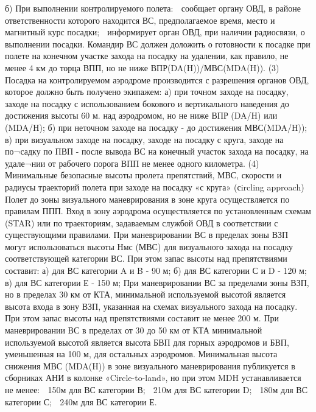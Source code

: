 б)	При выполнении контролируемого полета:
	сообщает органу ОВД, в районе ответственности которого находится ВС, предполагаемое время, место и магнитный курс посадки;
	информирует орган ОВД, при наличии радиосвязи, о выполнении посадки. 
Командир ВС должен доложить о готовности к посадке при полете на конечном участке захода на посадку на удалении, как правило, не менее 4 км до торца ВПП, но не ниже ВПР(DA(H))/МВС(MDA(H)).
(3) Посадка на контролируемом аэродроме производится с разрешения органов ОВД, которое должно быть получено экипажем:
а)	при точном заходе на посадку, заходе на посадку с использованием бокового и вертикального наведения до достижения высоты 60 м. над аэродромом, но не ниже ВПР (DA/H) или (MDA/H);
б)	при неточном заходе на посадку - до достижения МВС(MDA/H));
в)	при визуальном заходе на посадку, заходе на посадку с круга, заходе на по¬садку по ПВП - после вывода ВС на конечный участок захода на посадку, на удале¬нии от рабочего порога ВПП не менее одного километра.
(4) Минимальные безопасные высоты пролета препятствий, МВС, скорости и радиусы траекторий полета при заходе на посадку «с круга» (сircling approach)
Полет до зоны визуального маневрирования в зоне круга осуществляется по правилам ППП.
Вход в зону аэродрома осуществляется по установленным схемам (STAR) или по траекториям, задаваемым службой ОВД в соответствии с существующими правилами.
При маневрировании ВС в пределах зоны ВЗП могут использоваться высоты Нмс (МВС) для визуального захода на посадку соответствующей категории ВС. При этом запас высоты над препятствиями составит:
а)	для ВС категории A и B - 90 м;
б)	для ВС категории С и D - 120 м;
в)	для ВС категории Е - 150 м;
При маневрировании ВС за пределами зоны ВЗП, но в пределах 30 км от КТА, минимальной используемой высотой является высота входа в зону ВЗП, указанная на схемах визуального захода на посадку.
При этом запас высоты над препятствиями составит не менее 200 м.
При маневрировании ВС в пределах от 30 до 50 км от КТА минимальной используемой высотой является высота БВП для горных аэродромов и БВП, уменьшенная на 100 м, для остальных аэродромов.
Минимальная высота снижения МВС (MDA(H)) в зоне визуального маневрирования публикуется в сборниках АНИ в колонке «Circle-to-land», но при этом MDH устанавливается не менее:
   150м для ВС категории В;	 210м для ВС категории D;
   180м для ВС категории С;	 240м для ВС категории Е.

